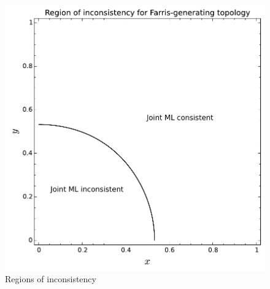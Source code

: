 \documentclass[a4paper]{article}
\begin{document}
\begin{figure}
\centering
\includegraphics[width=.9\textwidth]{analytic-inconsistency}
\caption{Regions of inconsistency}
\label{fig:inconsistency-farris}
\end{figure}



\end{document}

